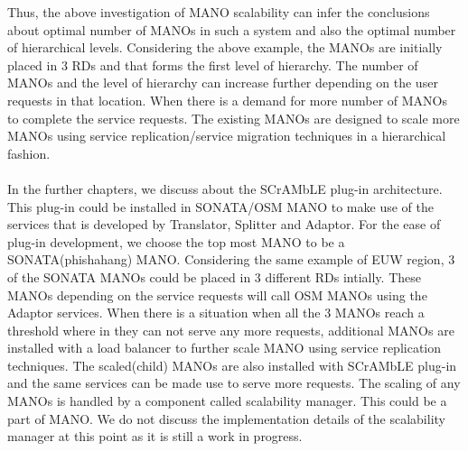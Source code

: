 Thus, the above investigation of MANO scalability can infer the conclusions about optimal number of MANOs in such a system and also the optimal number of hierarchical levels. Considering the above example, the MANOs are initially placed in 3 RDs and that forms the first level of hierarchy. The number of MANOs and the level of hierarchy can increase further depending on the user requests in that location. When there is a demand for more number of MANOs to complete the service requests. The existing MANOs are designed to scale more MANOs using service replication/service migration techniques in a hierarchical fashion. 

\paragraph{}In the further chapters, we discuss about the SCrAMbLE plug-in architecture. This plug-in could be installed in SONATA/OSM MANO to make use of the services that is developed by Translator, Splitter and Adaptor. For the ease of plug-in development, we choose the top most MANO to be a SONATA(phishahang) MANO. Considering the same example of EUW region, 3 of the SONATA MANOs could be placed in 3 different RDs intially. These MANOs depending on the service requests will call OSM MANOs using the Adaptor services. When there is a situation when all the 3 MANOs reach a threshold where in they can not serve any more requests, additional MANOs are installed with a load balancer to further scale MANO using service replication techniques. The scaled(child) MANOs are also installed with SCrAMbLE plug-in and the same services can be made use to serve more requests. 
The scaling of any MANOs is handled by a component called scalability manager. This could be a part of MANO. We do not discuss the implementation details of the scalability manager at this point as it is still a work in progress.
